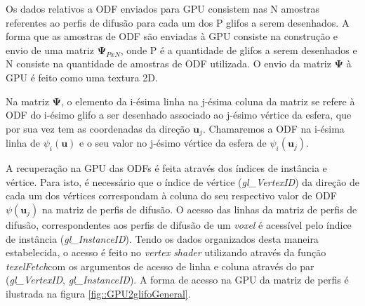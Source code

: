 \documentclass[
    12pt,                %
    oneside,            %
    a4paper,            %
    english,            %
    french,                %
    spanish,            %
    brazil                %
    ]{abntex2}
\begin{document}
Os dados relativos a ODF enviados para GPU consistem nas N amostras referentes ao perfis de difusão para cada um dos P glifos a serem desenhados. A forma que as amostras de ODF são enviadas à GPU consiste na construção e envio de uma matriz $\mathbf{\Psi}_{PxN}$, onde P é a quantidade de glifos a serem desenhados e N consiste na quantidade de amostras de ODF utilizada. O envio da matriz $\mathbf{\Psi}$ à GPU é feito como uma textura 2D. 

Na matriz $\mathbf{\Psi}$, o elemento da i-ésima linha na j-ésima coluna da matriz se refere à ODF do i-ésimo glifo a ser desenhado associado ao j-ésimo vértice da esfera, que por sua vez tem as coordenadas da direção $\mathbf{u}_j$. Chamaremos  a ODF na i-ésima linha de $\psi_i(\mathbf{u})$ e o seu valor no j-ésimo vértice da esfera de $\psi_i(\mathbf{u}_j)$.

A recuperação na GPU das ODFs é feita através dos índices de instância e vértice. Para isto, é necessário que o índice de vértice (\textit{gl\_VertexID}\footnotemark) da direção de cada um dos vértices correspondam à coluna do seu respectivo valor de ODF $\psi(\mathbf{u}_j)$ na matriz de perfis de difusão. O acesso das linhas da matriz de perfis de difusão, correspondentes aos perfis de difusão de um \textit{voxel} é acessível pelo índice de instância (\textit{gl\_InstanceID}\footnotemark[\value{footnote}]). Tendo os dados organizados desta maneira estabelecida, o acesso é feito no \textit{vertex shader} utilizando através da função \textit{texelFetch}\footnotemark[\value{footnote}] com os argumentos de acesso de linha e coluna através do par (\textit{gl\_VertexID}, \textit{gl\_InstanceID})\footnotemark[\value{footnote}]. A forma de acesso na GPU da matriz de perfis é ilustrada na figura \ref{fig::GPU2glifoGeneral}.
\end{document}
